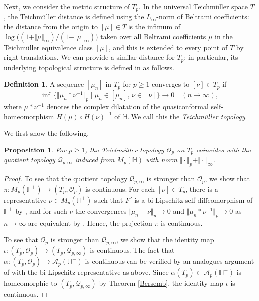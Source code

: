 \documentclass[amstex,12pt,reqno]{amsart}
\newtheorem{proposition}[theorem]{Proposition}
\theoremstyle{definition}
\newtheorem{definition}{Definition}
\begin{document}
Next, we consider the metric structure of $T_p$.
In the universal Teich\-m\"ul\-ler space $T$, the Teich\-m\"ul\-ler distance
is defined using the $L_\infty$-norm of Beltrami coefficients: 
the distance from the origin to $[\mu] \in T$ is
the infimum of $\log \bigl((1+\Vert \mu \Vert_\infty)/(1-\Vert \mu \Vert_\infty)\bigr)$ taken over all
Beltrami coefficients $\mu$ in the Teich\-m\"ul\-ler equivalence class $[\mu]$, and this is extended to every point of $T$ by
right translations.
We can provide a similar distance for $T_p$; in particular,
its underlying topological structure is defined in \cite{WM-1} as follows.

\begin{definition}
A sequence $[\mu_n]$ in $T_p$ for $p \geq 1$ converges to $[\nu] \in T_p$ if 
$$
\inf\,\{\Vert \mu_n \ast \nu^{-1}\Vert_p \mid \mu_n \in [\mu_n],\ \nu \in [\nu]\} \to 0 \quad (n \to \infty),
$$
where $ \mu \ast \nu^{-1}$ denotes the complex dilatation of 
the quasiconformal self-homeomorphism $H(\mu) \circ H(\nu)^{-1}$ of $\mathbb H$.
We call this the {\it Teich\-m\"ul\-ler topology}.
\end{definition}

We first show the following. 

\begin{proposition}
For $p \geq 1$,
the Teich\-m\"ul\-ler topology $\mathcal O_p$ on $T_p$ coincides with the quotient topology $\mathcal Q_{p,\infty}$
induced from $M_p(\mathbb H)$ with norm $\Vert \cdot \Vert_p+\Vert \cdot \Vert_\infty$.
\end{proposition}

\begin{proof}
To see that the quotient topology $\mathcal Q_{p,\infty}$ is stronger than $\mathcal O_p$, we show that
$\pi:M_p(\mathbb H^+) \to (T_p,\mathcal O_p)$ is continuous.
For each $[\nu] \in T_p$, there is a representative $\nu \in M_p(\mathbb H^+)$
such that $F^\nu$ is a bi-Lipschitz self-diffeomorphism of $\mathbb H^+$ by \cite[Lemma 3.4]{WM-1},
and for such $\nu$ the convergences $\Vert \mu_n-\nu \Vert_p \to 0$ and 
$\Vert \mu_n \ast \nu^{-1} \Vert_p \to 0$ as $n \to \infty$ are equivalent by \cite[Lemma 3.1]{WM-1}.
Hence, the projection $\pi$ is continuous.

To see that $\mathcal O_p$ is stronger than $\mathcal Q_{p,\infty}$, we show that
the identity map $\iota:(T_p,\mathcal O_p) \to (T_p,\mathcal Q_{p,\infty})$ is continuous.
The fact that $\alpha:(T_p,\mathcal O_p) \to \mathcal A_p(\mathbb H^-)$ is continuous can be verified
by an analogues argument of \cite[I, Lemma 2.9]{TT} with the bi-Lipschitz representative as above.
Since $\alpha(T_p) \subset \mathcal A_p(\mathbb H^-)$ is homeomorphic to $(T_p,\mathcal Q_{p,\infty})$
by Theorem \ref{Bersemb}, the identity map $\iota$ is continuous.
\end{proof}
\end{document}
